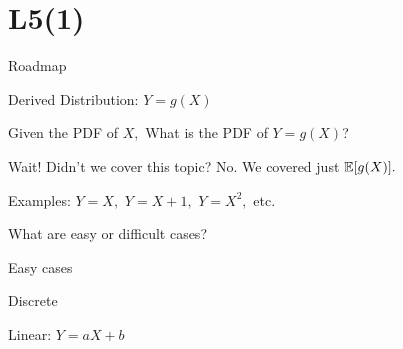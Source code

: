\section{L5(1)}
\begin{frame}{Roadmap}


\plitemsep 0.1in

\bce[(1)]

\item {}

\item {}


\ece

\end{frame}

\begin{frame}{Derived Distribution: $Y=g(X)$}

\plitemsep 0.1in

\bci
\item<1-> Given the PDF of $X,$ What is the PDF of $Y=g(X)$?

\item<2-> Wait! Didn't we cover this topic? No. We covered just $\mathbb{E}[ g(X) ].$

\item<3-> Examples: $Y=X,$ $Y=X+1,$ $Y=X^2,$ etc.

\item<4-> What are easy or difficult cases?

\item<5-> Easy cases

\bci
\item Discrete

\item Linear: $Y=aX +b$
\eci
\eci


\end{frame}

